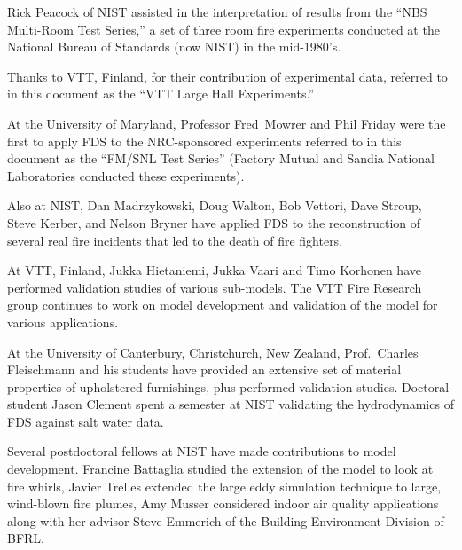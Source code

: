 \documentclass[11pt]{book}
\begin{document}
Rick Peacock of NIST assisted in the interpretation of results from
the ``NBS Multi-Room Test Series,'' a set of three room
fire experiments conducted at the National Bureau of Standards (now
NIST) in the mid-1980's.

Thanks to VTT, Finland, for their contribution of experimental data,
referred to in this document as the ``VTT Large Hall Experiments.''

At the University of Maryland, Professor Fred~Mowrer and Phil Friday
were the first to apply FDS to the NRC-sponsored experiments referred
to in this document as the ``FM/SNL Test Series'' (Factory Mutual and
Sandia National Laboratories conducted these experiments).

Also at NIST, Dan Madrzykowski, Doug Walton, Bob Vettori, Dave Stroup,
Steve Kerber, and Nelson Bryner have applied FDS to the reconstruction
of several real fire incidents that led to the death of fire fighters.

At VTT, Finland, Jukka Hietaniemi, Jukka Vaari and Timo Korhonen have
performed validation studies of various sub-models. The VTT Fire
Research group continues to work on model development and
validation of the model for various applications.

At the University of Canterbury, Christchurch, New Zealand,
Prof.~Charles Fleischmann and his students have provided an extensive
set of material properties of upholstered furnishings, plus performed
validation studies. Doctoral student Jason Clement spent a semester at
NIST validating the hydrodynamics of FDS against salt water data.

Several postdoctoral fellows at NIST have made contributions to model
development. Francine Battaglia studied the extension of the model to
look at fire whirls, Javier Trelles extended the large eddy simulation
technique to large, wind-blown fire plumes, Amy Musser considered
indoor air quality applications along with her advisor Steve Emmerich
of the Building Environment Division of BFRL.




\tableofcontents

\mainmatter

















\backmatter




\end{document}
